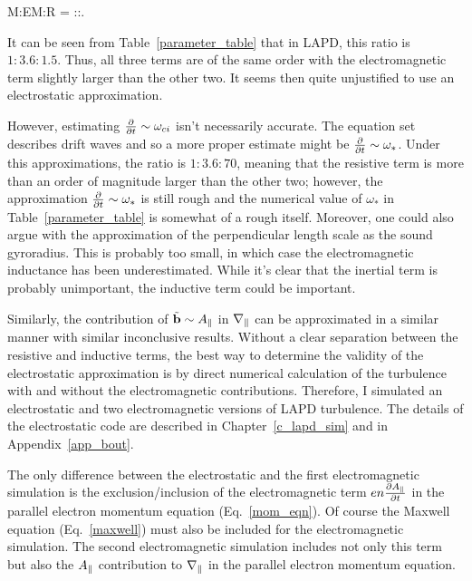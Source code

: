 \beq
\label{adiabatic_ratio}
M:EM:R = \fmei:\beta:. 
\eeq

It can be seen from Table~\ref{parameter_table} that in LAPD, this ratio is 
$1:3.6:1.5$. Thus, all three terms are of the same order with the electromagnetic term slightly larger than the other two. It seems then quite unjustified to use an electrostatic
approximation. 

However, estimating $\frac{\partial}{\partial t} \sim \omega_{ci}$ isn't necessarily accurate. The equation set describes drift waves and so a more proper estimate might be
$\frac{\partial}{\partial t} \sim \omega_{*}$. Under this approximations, the ratio is $1:3.6:70$, meaning that the resistive term is more than an order of magnitude larger than the other two; however, the 
approximation $\frac{\partial}{\partial t} \sim \omega_{*}$ is still rough and the numerical value of $\omega_{*}$ in Table~\ref{parameter_table} is somewhat of a rough itself. 
Moreover, one could also argue with the approximation of the perpendicular length scale as the sound gyroradius. 
This is probably too small, in which case the electromagnetic inductance has been underestimated. While it's clear that
the inertial term is probably unimportant, the inductive term could be important. 

Similarly, the contribution of $\tilde{{\bf b}} \sim A_\parallel$ in $\nabla_\parallel$ can be approximated in a similar manner with similar inconclusive results. 
Without a clear separation between the resistive and inductive terms, the best way to determine the validity of
the electrostatic approximation is by direct numerical calculation of the turbulence with and without the electromagnetic contributions. 
Therefore, I simulated an electrostatic and two electromagnetic versions of LAPD turbulence. 
The details of the electrostatic code are described in Chapter~\ref{c_lapd_sim} and in Appendix~\ref{app_bout}.

The only difference between the electrostatic and the first electromagnetic simulation is the exclusion/inclusion of the electromagnetic term $e n \frac{\partial A_\parallel}{\partial t}$ 
in the parallel electron momentum equation (Eq.~\ref{mom_eqn}). Of course the Maxwell equation
(Eq.~\ref{maxwell}) must also be included for the electromagnetic simulation. The second electromagnetic simulation includes not only this term
 but also the $A_\parallel$ contribution to $\nabla_\parallel$ in the parallel electron momentum equation.


